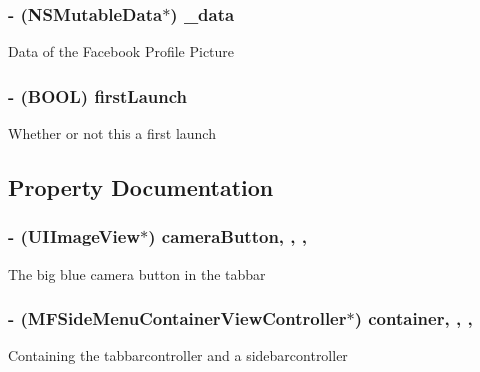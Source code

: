 \subsubsection[{\+\_\+data}]{\setlength{\rightskip}{0pt plus 5cm}-\/ (N\+S\+Mutable\+Data$\ast$) \+\_\+data\hspace{0.3cm}{\ttfamily [protected]}}\label{interface_app_delegate_ae3f9e31861537f349282d429a83a5f7a}
Data of the Facebook Profile Picture \hypertarget{interface_app_delegate_ab5357e16bdef7cd69162d349a438addd}{}
\subsubsection[{first\+Launch}]{\setlength{\rightskip}{0pt plus 5cm}-\/ (B\+O\+O\+L) first\+Launch\hspace{0.3cm}{\ttfamily [protected]}}\label{interface_app_delegate_ab5357e16bdef7cd69162d349a438addd}
Whether or not this a first launch 

\subsection{Property Documentation}
\hypertarget{interface_app_delegate_a0585eced954c9e81d64a18a1372f904b}{}
\subsubsection[{camera\+Button}]{\setlength{\rightskip}{0pt plus 5cm}-\/ (U\+I\+Image\+View$\ast$) camera\+Button\hspace{0.3cm}{\ttfamily [read]}, {\ttfamily [write]}, {\ttfamily [nonatomic]}, {\ttfamily [strong]}}\label{interface_app_delegate_a0585eced954c9e81d64a18a1372f904b}
The big blue camera button in the tabbar \hypertarget{interface_app_delegate_a22a3aaa12e2cf780b4bdfd498b5e0163}{}
\subsubsection[{container}]{\setlength{\rightskip}{0pt plus 5cm}-\/ (M\+F\+Side\+Menu\+Container\+View\+Controller$\ast$) container\hspace{0.3cm}{\ttfamily [read]}, {\ttfamily [write]}, {\ttfamily [nonatomic]}, {\ttfamily [strong]}}\label{interface_app_delegate_a22a3aaa12e2cf780b4bdfd498b5e0163}
Containing the tabbarcontroller and a sidebarcontroller \hypertarget{interface_app_delegate_a9fd0ff1892f8d79580c105c42cb1edfb}{}
